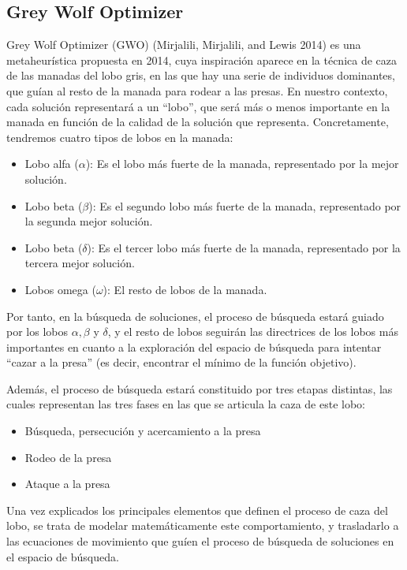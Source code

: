 \documentclass[
  a4paper,
,tablecaptionabove
]{scrartcl}
\providecommand{\tightlist}{%
  \setlength{\itemsep}{0pt}\setlength{\parskip}{0pt}}
\begin{document}
\hypertarget{grey-wolf-optimizer}{%
\subsection{Grey Wolf Optimizer}\label{grey-wolf-optimizer}}

Grey Wolf Optimizer (GWO) (Mirjalili, Mirjalili, and Lewis 2014) es una
metaheurística propuesta en 2014, cuya inspiración aparece en la técnica
de caza de las manadas del lobo gris, en las que hay una serie de
individuos dominantes, que guían al resto de la manada para rodear a las
presas. En nuestro contexto, cada solución representará a un
\enquote{lobo}, que será más o menos importante en la manada en función
de la calidad de la solución que representa. Concretamente, tendremos
cuatro tipos de lobos en la manada:

\begin{itemize}
\tightlist
\item
  Lobo alfa (\(\alpha\)): Es el lobo más fuerte de la manada,
  representado por la mejor solución.
\item
  Lobo beta (\(\beta\)): Es el segundo lobo más fuerte de la manada,
  representado por la segunda mejor solución.
\item
  Lobo beta (\(\delta\)): Es el tercer lobo más fuerte de la manada,
  representado por la tercera mejor solución.
\item
  Lobos omega (\(\omega\)): El resto de lobos de la manada.
\end{itemize}

Por tanto, en la búsqueda de soluciones, el proceso de búsqueda estará
guiado por los lobos \(\alpha, \beta\) y \(\delta\), y el resto de lobos
seguirán las directrices de los lobos más importantes en cuanto a la
exploración del espacio de búsqueda para intentar \enquote{cazar a la
presa} (es decir, encontrar el mínimo de la función objetivo).

Además, el proceso de búsqueda estará constituido por tres etapas
distintas, las cuales representan las tres fases en las que se articula
la caza de este lobo:

\begin{itemize}
\tightlist
\item
  Búsqueda, persecución y acercamiento a la presa
\item
  Rodeo de la presa
\item
  Ataque a la presa
\end{itemize}

Una vez explicados los principales elementos que definen el proceso de
caza del lobo, se trata de modelar matemáticamente este comportamiento,
y trasladarlo a las ecuaciones de movimiento que guíen el proceso de
búsqueda de soluciones en el espacio de búsqueda.
\end{document}
